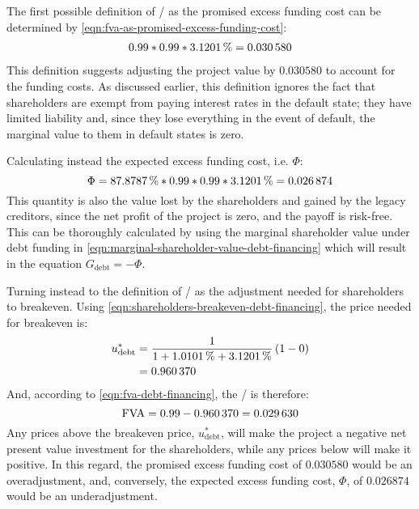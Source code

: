 \documentclass[main.tex]{subfiles}
\begin{document}
        The first possible definition of \FVA/ as the promised excess funding cost can be determined by
        \cref{eqn:fva-as-promised-excess-funding-cost}:
            \begin{align}
                \num{0.99} * \num{0.99} * \pct{0.031201} = \num{0.030580}
            \end{align}
        This definition suggests adjusting the project value by $\num{0.030580}$ to account for the funding costs.
        As discussed earlier, this definition ignores the fact that shareholders are exempt from paying
        interest rates in the default state; they have limited liability and, since they lose everything
        in the event of default, the marginal value to them in default states is zero.
        
        Calculating instead the expected excess funding cost, i.e. $\Phi$:
            \begin{equation}
                \Phi 
                = \pct{0.878787} * \num{0.99}  * \num{0.99} * \pct{0.031201} 
                = \num{0.026874}
            \end{equation}
        This quantity is also the value lost by the shareholders and gained by the legacy creditors,
        since the net profit of the project is zero, and the payoff is risk-free.
        This can be thoroughly calculated by using the marginal shareholder value under debt funding in 
        \cref{eqn:marginal-shareholder-value-debt-financing}
        which will result in the equation $G_{\text{debt}} = -\Phi$. 
        
        Turning instead to the definition of \FVA/ as the adjustment needed for shareholders to breakeven.
        Using \cref{eqn:shareholders-breakeven-debt-financing}, the price needed for breakeven is:
            \begin{align}
                    u^{\ast}_{\text{debt}} 
                &=
                    \frac{
                        \num{1}
                    }{
                        \num{1} + \pct{0.010101} + \pct{0.031201}
                    }
                    \left(
                        \num{1}
                        -
                        \num{0}
                    \right)
                \nonumber \\
                &=
                    \num{0.960370}
            \end{align}
        And, according to \cref{eqn:fva-debt-financing}, the \FVA/ is therefore:
            \begin{equation}
                    \FVA/ 
                =
                    \num{0.99} - \num{0.960370}
                =
                    \num{0.029630}
            \end{equation}
        Any prices above the breakeven price, $u^{\ast}_{\text{debt}}$, 
        will make the project a negative net present value investment for the shareholders, while any prices below will make it positive. 
        In this regard, the promised excess funding cost of $\num{0.030580}$ would be an overadjustment,
        and, conversely, the expected excess funding cost, $\Phi$, of $\num{0.026874}$ would be an underadjustment.
        
\end{document}
